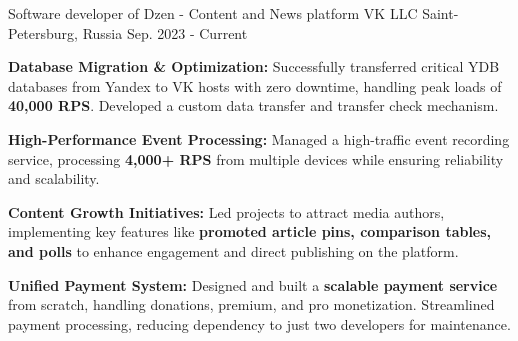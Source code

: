 

\begin{cventries}

  \cventry
    {Software developer of Dzen - Content and News platform} %
    {VK LLC} %
    {Saint-Petersburg, Russia} %
    {Sep. 2023 - Current} %
    {
      \begin{cvitems} %
        \item {\textbf{Database Migration \& Optimization:} Successfully transferred critical YDB databases from Yandex to VK hosts with zero downtime, handling peak loads of \textbf{40,000 RPS}. Developed a custom data transfer and transfer check mechanism.}
        \item {\textbf{High-Performance Event Processing:} Managed a high-traffic event recording service, processing \textbf{4,000+ RPS} from multiple devices while ensuring reliability and scalability.}
        \item {\textbf{Content Growth Initiatives:} Led projects to attract media authors, implementing key features like \textbf{promoted article pins, comparison tables, and polls} to enhance engagement and direct publishing on the platform.}
        \item {\textbf{Unified Payment System:} Designed and built a \textbf{scalable payment service} from scratch, handling donations, premium, and pro monetization. Streamlined payment processing, reducing dependency to just two developers for maintenance.}
      \end{cvitems}
    }


\end{cventries}
